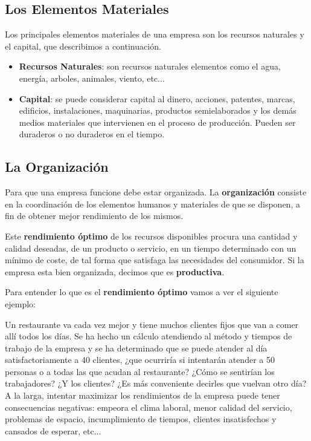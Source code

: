 \subsection{Los Elementos Materiales}
Los principales elementos materiales de una empresa son los recursos naturales y el capital, que describimos a continuación.

\begin{itemize}
    \item \textbf{Recursos Naturales}: son recursos naturales elementos como el agua, energía, arboles, animales, viento, etc...

    \item \textbf{Capital}: se puede considerar capital  al dinero, acciones, patentes, marcas, edificios, instalaciones, maquinarias, productos semielaborados y los demás medios materiales que intervienen en el proceso de producción. Pueden ser duraderos o no duraderos en el tiempo.
\end{itemize}

\subsection{La Organización}
Para que una empresa funcione debe estar organizada. La \textbf{organización} consiste en la coordinación de los elementos humanos y materiales de que se disponen, a fin de obtener mejor rendimiento  de los mismos.

Este \textbf{rendimiento óptimo} de los recursos disponibles procura una cantidad  y calidad deseadas, de un producto o servicio, en un tiempo determinado con un mínimo de coste, de tal forma que satisfaga las necesidades del consumidor. Si la empresa esta bien organizada, decimos que es \textbf{productiva}.

Para entender lo que es el \textbf{rendimiento óptimo} vamos a ver el siguiente ejemplo:

Un restaurante va cada vez mejor y tiene muchos clientes fijos que van a comer allí todos los días. Se ha hecho un cálculo atendiendo al método y tiempos de trabajo de la empresa y se ha determinado que se puede atender al día satisfactoriamente a 40 clientes, ¿que ocurriría si intentarán atender a 50 personas o a todas las que acudan al restaurante? ¿Cómo se sentirían los trabajadores? ¿Y los clientes? ¿Es más conveniente decirles que vuelvan otro día? A la larga, intentar maximizar los rendimientos de la empresa puede tener consecuencias negativas: empeora el clima laboral, menor calidad del servicio, problemas de espacio, incumplimiento de tiempos, clientes insatisfechos y cansados de esperar, etc...

